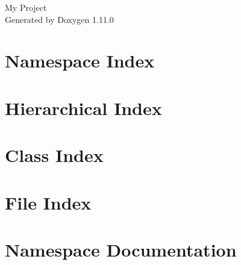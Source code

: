 \documentclass[twoside]{book}
\newcommand{\+}{\discretionary{\mbox{\scriptsize$\hookleftarrow$}}{}{}}
\newcommand{\clearemptydoublepage}{%
    \newpage{\pagestyle{empty}\cleardoublepage}%
  }
\begin{document}
  \raggedbottom
    \hypersetup{pageanchor=false,
                bookmarksnumbered=true,
                pdfencoding=unicode
               }
  \begin{titlepage}
  \vspace*{7cm}
  \begin{center}%
  {\Large My Project}\\
  \vspace*{1cm}
  {\large Generated by Doxygen 1.11.0}\\
  \end{center}
  \end{titlepage}
  \clearemptydoublepage
  \tableofcontents
  \clearemptydoublepage
  \hypersetup{pageanchor=true}
\chapter{Namespace Index}

\chapter{Hierarchical Index}

\chapter{Class Index}

\chapter{File Index}

\chapter{Namespace Documentation}




\end{document}
